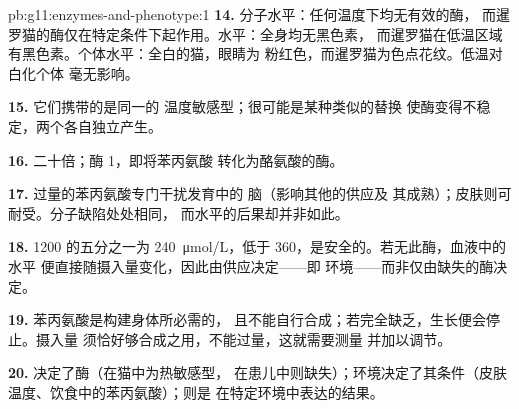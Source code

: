 \begin{solution}{pb:g11:enzymes-and-phenotype:1}
\textbf{14.} 分子水平：任何温度下均无有效的酶，
而暹罗猫的酶仅在特定条件下起作用。水平：全身均无黑色素，
而暹罗猫在低温区域有黑色素。个体水平：全白的猫，眼睛为
粉红色，而暹罗猫为色点花纹。低温对白化个体
毫无影响。

\textbf{15.} 它们携带的是同一的
温度敏感型；很可能是某种类似的替换
使酶变得不稳定，两个各自独立产生。

\textbf{16.} 二十倍；酶 1，即将苯丙氨酸
转化为酪氨酸的酶。

\textbf{17.} 过量的苯丙氨酸专门干扰发育中的
脑（影响其他的供应及
其成熟）；皮肤则可耐受。分子缺陷处处相同，
而水平的后果却并非如此。

\textbf{18.} \num{1200} 的五分之一为 \qty{240}{\micro mol/L}，低于
\num{360}，是安全的。若无此酶，血液中的水平
便直接随摄入量变化，因此由供应决定——即
环境——而非仅由缺失的酶决定。

\textbf{19.} 苯丙氨酸是构建身体所必需的，
且不能自行合成；若完全缺乏，生长便会停止。摄入量
须恰好够合成之用，不能过量，这就需要测量
并加以调节。

\textbf{20.} 决定了酶（在猫中为热敏感型，
在患儿中则缺失）；环境决定了其条件（皮肤
温度、饮食中的苯丙氨酸）；则是
在特定环境中表达的结果。
\end{solution}
